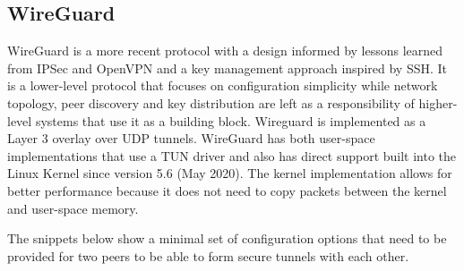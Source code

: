 \hypertarget{thesis__020-related-work.md__wireguard}{%
\subsection{WireGuard}\label{thesis__020-related-work.md__wireguard}}

WireGuard \autocite{donenfeldWireGuardNextGeneration2017} is a more
recent protocol with a design informed by lessons learned from IPSec and
OpenVPN and a key management approach inspired by SSH. It is a
lower-level protocol that focuses on configuration simplicity while
network topology, peer discovery and key distribution are left as a
responsibility of higher-level systems that use it as a building block.
Wireguard is implemented as a Layer 3 overlay over UDP tunnels.
WireGuard has both user-space implementations that use a TUN driver and
also has direct support built into the Linux Kernel since version 5.6
(May 2020). The kernel implementation allows for better performance
because it does not need to copy packets between the kernel and
user-space memory.

The snippets below show a minimal set of configuration options that need
to be provided for two peers to be able to form secure tunnels with each
other.

\begin{Shaded}
\begin{Highlighting}[]
\KeywordTok{[Interface]}
\OtherTok{=}
\OtherTok{=}\StringTok{ }
\OtherTok{=}

\KeywordTok{[Peer]}
\OtherTok{=}
\OtherTok{=}
\OtherTok{=}
\end{Highlighting}
\end{Shaded}

\begin{Shaded}
\begin{Highlighting}[]
\KeywordTok{[Interface]}
\OtherTok{=}
\OtherTok{=}\StringTok{ }
\OtherTok{=}

\KeywordTok{[Peer]}
\OtherTok{=}
\OtherTok{=}
\end{Highlighting}
\end{Shaded}

